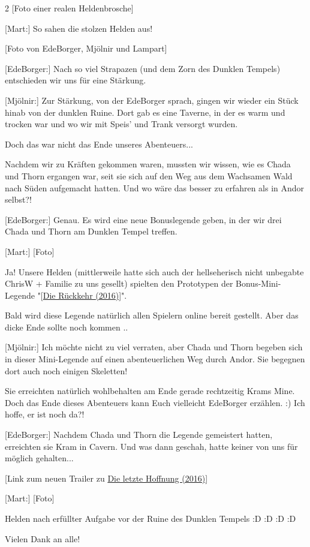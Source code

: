 \documentclass[10pt, a4paper, oneside]{book}
\newcommand{\reflegende}[1]{\hyperref[Legende: #1]{#1}}
\newcommand{\refprodukt}[1]{\hyperref[Produkt: #1]{#1}}
\begin{document}
\begin{multicols}{2}
[Foto einer realen Heldenbrosche]

[Mart:] So sahen die stolzen Helden aus!

[Foto von EdeBorger, Mjölnir und Lampart]

[EdeBorger:] Nach so viel Strapazen (und dem Zorn des Dunklen Tempels) entschieden wir uns für eine Stärkung.

[Mjölnir:]  Zur Stärkung, von der EdeBorger sprach, gingen wir wieder ein Stück hinab von der dunklen Ruine. Dort gab es eine Taverne, in der es warm und trocken war und wo wir mit Speis' und Trank versorgt wurden.

Doch das war nicht das Ende unseres Abenteuers...

Nachdem wir zu Kräften gekommen waren, mussten wir wissen, wie es Chada und Thorn ergangen war, seit sie sich auf den Weg aus dem Wachsamen Wald nach Süden aufgemacht hatten. Und wo wäre das besser zu erfahren als in Andor selbst?!

[EdeBorger:] Genau. Es wird eine neue Bonuslegende geben, in der wir drei Chada und Thorn am Dunklen Tempel treffen.

[Mart:] [Foto]

Ja! Unsere Helden (mittlerweile hatte sich auch der hellseherisch nicht unbegabte ChrisW + Familie zu uns gesellt) spielten den Prototypen der Bonus-Mini-Legende "[\reflegende{Die Rückkehr (2016)}]".

Bald wird diese Legende natürlich allen Spielern online bereit gestellt. Aber das dicke Ende sollte noch kommen ..

[Mjölnir:] Ich möchte nicht zu viel verraten, aber Chada und Thorn begeben sich in dieser Mini-Legende auf einen abenteuerlichen Weg durch Andor. Sie begegnen dort auch noch einigen Skeletten!

Sie erreichten natürlich wohlbehalten am Ende gerade rechtzeitig Krams Mine. Doch das Ende dieses Abenteuers kann Euch vielleicht EdeBorger erzählen. :) Ich hoffe, er ist noch da?!

[EdeBorger:] Nachdem Chada und Thorn die Legende gemeistert hatten, erreichten sie Kram in Cavern. Und was dann geschah, hatte keiner von uns für möglich gehalten...

[Link zum neuen Trailer zu \refprodukt{Die letzte Hoffnung (2016)}]

[Mart:] [Foto]

Helden nach erfüllter Aufgabe vor der Ruine des Dunklen Tempels :D :D :D :D

Vielen Dank an alle!



\end{multicols}
\end{document}
